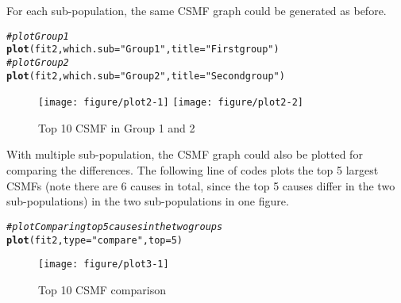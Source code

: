 \documentclass{article}\usepackage[]{graphicx}\usepackage[]{color}
\makeatletter
\def\maxwidth{ %
  \ifdim\Gin@nat@width>\linewidth
    \linewidth
  \else
    \Gin@nat@width
  \fi
}
\newcommand{\hlnum}[1]{\textcolor[rgb]{0.686,0.059,0.569}{#1}}%
\newcommand{\hlstr}[1]{\textcolor[rgb]{0.192,0.494,0.8}{#1}}%
\newcommand{\hlcom}[1]{\textcolor[rgb]{0.678,0.584,0.686}{\textit{#1}}}%
\newcommand{\hlstd}[1]{\textcolor[rgb]{0.345,0.345,0.345}{#1}}%
\newcommand{\hlkwc}[1]{\textcolor[rgb]{0.333,0.667,0.333}{#1}}%
\newcommand{\hlkwd}[1]{\textcolor[rgb]{0.737,0.353,0.396}{\textbf{#1}}}%
\newenvironment{kframe}{%
 \def\at@end@of@kframe{}%
 \ifinner\ifhmode%
  \def\at@end@of@kframe{\end{minipage}}%
  \begin{minipage}{\columnwidth}%
 \fi\fi%
 \def\FrameCommand##1{\hskip\@totalleftmargin \hskip-\fboxsep
 \colorbox{shadecolor}{##1}\hskip-\fboxsep
     \hskip-\linewidth \hskip-\@totalleftmargin \hskip\columnwidth}%
 \MakeFramed {\advance\hsize-\width
   \@totalleftmargin\z@ \linewidth\hsize
   \@setminipage}}%
 {\par\unskip\endMakeFramed%
 \at@end@of@kframe}
\newenvironment{knitrout}{}{} %
\makeatother
\begin{document}
For each sub-population, the same CSMF graph could be generated as before. 
\begin{knitrout}
\color{fgcolor}\begin{kframe}
\begin{alltt}
\hlcom{# plot Group1}
\hlkwd{plot}\hlstd{(fit2,} \hlkwc{which.sub} \hlstd{=} \hlstr{"Group1"}\hlstd{,} \hlkwc{title} \hlstd{=} \hlstr{"First group"}\hlstd{)}
\hlcom{# plot Group2}
\hlkwd{plot}\hlstd{(fit2,} \hlkwc{which.sub} \hlstd{=} \hlstr{"Group2"}\hlstd{,} \hlkwc{title} \hlstd{=} \hlstr{"Second group"}\hlstd{)}
\end{alltt}
\end{kframe}\begin{figure}[!ht]

{\centering \texttt{[image: figure/plot2-1]} 
\texttt{[image: figure/plot2-2]} 

}

\caption[Top 10 CSMF in Group 1 and 2]{Top 10 CSMF in Group 1 and 2}\label{fig:plot2}
\end{figure}


\end{knitrout}

With multiple sub-population, the CSMF graph could also be plotted for comparing the differences. The following line of codes plots the top 5 largest CSMFs (note there are 6 causes in total, since the top 5 causes differ in the two sub-populations) in the two sub-populations in one figure. 
\begin{knitrout}
\color{fgcolor}\begin{kframe}
\begin{alltt}
\hlcom{# plot Comparing top 5 causes in the two groups }
\hlkwd{plot}\hlstd{(fit2,} \hlkwc{type} \hlstd{=} \hlstr{"compare"}\hlstd{,} \hlkwc{top} \hlstd{=} \hlnum{5}\hlstd{)}
\end{alltt}
\end{kframe}\begin{figure}[!ht]

{\centering \texttt{[image: figure/plot3-1]} 

}

\caption[Top 10 CSMF comparison]{Top 10 CSMF comparison}\label{fig:plot3}
\end{figure}


\end{knitrout}
\end{document}
